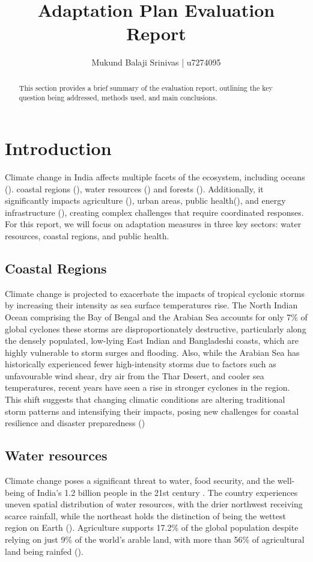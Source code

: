 \documentclass[12pt]{article}
\title{Adaptation Plan Evaluation Report}
\author{Mukund Balaji Srinivas | u7274095}
\date{} %
\begin{document}
\maketitle

\begin{abstract}
This section provides a brief summary of the evaluation report, outlining the key question being addressed, methods used, 
and main conclusions.
\end{abstract}

\newpage

\section*{Introduction}
Climate change in India affects multiple facets of the ecosystem, including oceans (\cite{marathe_2021}).
coastal regions (\cite{gupta_2019}), water resources (\cite{shiva_shankar_2021}) and forests (\cite{Lele2019ClimateCA}). Additionally, it significantly impacts 
agriculture (\cite{Kumar2023DeterminantsOC}), urban areas, public health(\cite{rajput_2022}), and energy infrastructure (\cite{Yarlagadda_22}), 
creating complex challenges that require coordinated responses. For this report, we will focus on adaptation measures in three key sectors: water resources, coastal regions, and public health.
\subsection*{Coastal Regions}
Climate change is projected to exacerbate the impacts of tropical cyclonic storms by increasing their intensity as sea surface temperatures 
rise. The North Indian Ocean comprising the Bay of Bengal and the Arabian Sea accounts for only 7\% of global cyclones 
these storms are disproportionately destructive, particularly along the densely populated, low-lying East Indian and Bangladeshi coasts, 
which are highly vulnerable to storm surges and flooding. Also, while the Arabian Sea has historically experienced fewer high-intensity storms due to 
factors such as unfavourable wind shear, dry air from the Thar Desert, and cooler sea temperatures, recent years have seen a rise in stronger cyclones 
in the region. This shift suggests that changing climatic conditions are altering traditional storm patterns and intensifying their impacts, posing 
new challenges for coastal resilience and disaster preparedness (\cite{gupta_2019})

\subsection*{Water resources}
Climate change poses a significant threat to water, food security, and the well-being of India’s 
1.2 billion people in the 21st century . The country experiences uneven spatial distribution of water resources, 
with the drier northwest receiving scarce rainfall, while the northeast holds the distinction of being the 
wettest region on Earth (\cite{goyal_2018}). Agriculture supports 17.2\% of the global population 
despite relying on just 9\% of the world's arable land, with more than 56\% of agricultural land being rainfed (\cite{goyal_2018}). 
\end{document}
